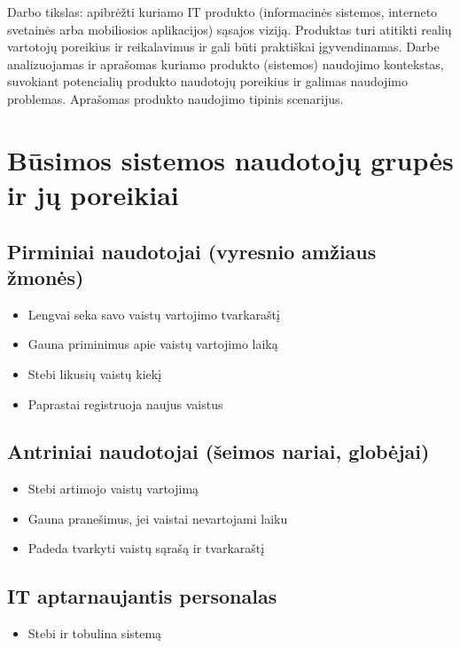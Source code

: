\documentclass[14pt]{extarticle}
\begin{document}
Darbo tikslas: apibrėžti kuriamo IT produkto (informacinės sistemos, interneto svetainės arba
mobiliosios aplikacijos) sąsajos viziją. Produktas turi atitikti realių vartotojų poreikius ir
reikalavimus ir gali būti praktiškai įgyvendinamas. Darbe analizuojamas ir aprašomas kuriamo
produkto (sistemos) naudojimo kontekstas, suvokiant potencialių produkto naudotojų
poreikius ir galimas naudojimo problemas. Aprašomas produkto naudojimo tipinis scenarijus.

\clearpage

\section{Būsimos sistemos naudotojų grupės ir jų poreikiai}

\subsection{Pirminiai naudotojai (vyresnio amžiaus žmonės)}

\begin{itemize}
	\item Lengvai seka savo vaistų vartojimo tvarkaraštį
	\item Gauna priminimus apie vaistų vartojimo laiką
	\item Stebi likusių vaistų kiekį
	\item Paprastai registruoja naujus vaistus
\end{itemize}

\subsection{Antriniai naudotojai (šeimos nariai, globėjai)}

\begin{itemize}
	\item Stebi artimojo vaistų vartojimą
	\item Gauna pranešimus, jei vaistai nevartojami laiku
	\item Padeda tvarkyti vaistų sąrašą ir tvarkaraštį
\end{itemize}

\subsection{IT aptarnaujantis personalas}

\begin{itemize}
	\item Stebi ir tobulina sistemą
\end{itemize}
\end{document}

